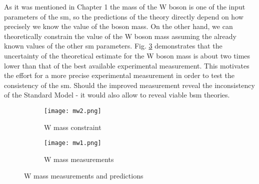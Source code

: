     As it was mentioned in Chapter 1 the mass of the W boson is one of the input parameters of the \gls{sm}, so the predictions of the theory directly depend on how precisely we know the value of the boson mass. On the other hand, we can theoretically constrain the value of the W boson mass assuming the already known values of the other \gls{sm} parameters. Fig. \ref{fig::w_values} demonstrates that the uncertainty of the theoretical estimate for the W boson mass is about two times lower than that of the best available experimental measurement. This motivates the effort for a more precise experimental measurement in order to test the consistency of the \gls{sm}. Should the improved measurement reveal the inconsistency of the Standard Model - it would also allow to reveal viable \gls{bsm} theories. 
    	\begin{figure}[htbp]
    	\begin{subfigure}[t]{0.48\textwidth}
    		\texttt{[image: mw2.png]}
    		\caption[Side view]{W mass constraint}
    		\label{fig::w_constraint}
    	\end{subfigure}
    	\hfill
    	\begin{subfigure}[t]{0.48\textwidth} 
    		\texttt{[image: mw1.png]}
    		\caption[Transverse view]{W mass measurements}
    		\label{fig::w_measurement}
    	\end{subfigure}
    	\caption{W mass measurements and predictions}
    	\label{fig::w_values}
    \end{figure}
